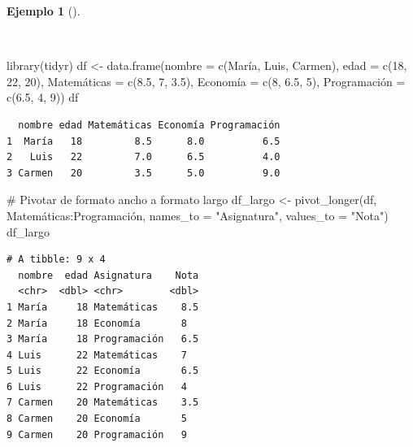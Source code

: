 \documentclass[
  a4paper,
]{scrreport}
\newenvironment{Shaded}{\begin{snugshade}}{\end{snugshade}}
\newcommand{\AttributeTok}[1]{\textcolor[rgb]{0.40,0.45,0.13}{#1}}
\newcommand{\CommentTok}[1]{\textcolor[rgb]{0.37,0.37,0.37}{#1}}
\newcommand{\DecValTok}[1]{\textcolor[rgb]{0.68,0.00,0.00}{#1}}
\newcommand{\FloatTok}[1]{\textcolor[rgb]{0.68,0.00,0.00}{#1}}
\newcommand{\FunctionTok}[1]{\textcolor[rgb]{0.28,0.35,0.67}{#1}}
\newcommand{\NormalTok}[1]{\textcolor[rgb]{0.00,0.23,0.31}{#1}}
\newcommand{\OtherTok}[1]{\textcolor[rgb]{0.00,0.23,0.31}{#1}}
\newcommand{\SpecialCharTok}[1]{\textcolor[rgb]{0.37,0.37,0.37}{#1}}
\newcommand{\StringTok}[1]{\textcolor[rgb]{0.13,0.47,0.30}{#1}}
\theoremstyle{definition}
\theoremstyle{definition}
\newtheorem{example}{Ejemplo}[chapter]
\theoremstyle{remark}
\begin{document}
\begin{example}[]\protect\hypertarget{exm-pivotar-formato-ancho-a-largo}{}\label{exm-pivotar-formato-ancho-a-largo}

~

\begin{Shaded}
\begin{Highlighting}[]
\FunctionTok{library}\NormalTok{(tidyr)}
\NormalTok{df }\OtherTok{\textless{}{-}} \FunctionTok{data.frame}\NormalTok{(}\AttributeTok{nombre =} \FunctionTok{c}\NormalTok{(}\StringTok{\textquotesingle{}María\textquotesingle{}}\NormalTok{, }\StringTok{\textquotesingle{}Luis\textquotesingle{}}\NormalTok{, }\StringTok{\textquotesingle{}Carmen\textquotesingle{}}\NormalTok{), }
\AttributeTok{edad =} \FunctionTok{c}\NormalTok{(}\DecValTok{18}\NormalTok{, }\DecValTok{22}\NormalTok{, }\DecValTok{20}\NormalTok{), }
\NormalTok{Matemáticas }\OtherTok{=} \FunctionTok{c}\NormalTok{(}\FloatTok{8.5}\NormalTok{, }\DecValTok{7}\NormalTok{, }\FloatTok{3.5}\NormalTok{),}
\NormalTok{Economía }\OtherTok{=} \FunctionTok{c}\NormalTok{(}\DecValTok{8}\NormalTok{, }\FloatTok{6.5}\NormalTok{, }\DecValTok{5}\NormalTok{),}
\NormalTok{Programación }\OtherTok{=} \FunctionTok{c}\NormalTok{(}\FloatTok{6.5}\NormalTok{, }\DecValTok{4}\NormalTok{, }\DecValTok{9}\NormalTok{))}
\NormalTok{df}
\end{Highlighting}
\end{Shaded}

\begin{verbatim}
  nombre edad Matemáticas Economía Programación
1  María   18         8.5      8.0          6.5
2   Luis   22         7.0      6.5          4.0
3 Carmen   20         3.5      5.0          9.0
\end{verbatim}

\begin{Shaded}
\begin{Highlighting}[]
\CommentTok{\# Pivotar de formato ancho a formato largo}
\NormalTok{df\_largo }\OtherTok{\textless{}{-}} \FunctionTok{pivot\_longer}\NormalTok{(df, Matemáticas}\SpecialCharTok{:}\NormalTok{Programación, }\AttributeTok{names\_to =} \StringTok{"Asignatura"}\NormalTok{, }\AttributeTok{values\_to =} \StringTok{"Nota"}\NormalTok{)}
\NormalTok{df\_largo}
\end{Highlighting}
\end{Shaded}

\begin{verbatim}
# A tibble: 9 x 4
  nombre  edad Asignatura    Nota
  <chr>  <dbl> <chr>        <dbl>
1 María     18 Matemáticas    8.5
2 María     18 Economía       8  
3 María     18 Programación   6.5
4 Luis      22 Matemáticas    7  
5 Luis      22 Economía       6.5
6 Luis      22 Programación   4  
7 Carmen    20 Matemáticas    3.5
8 Carmen    20 Economía       5  
9 Carmen    20 Programación   9  
\end{verbatim}


\end{example}
\end{document}
